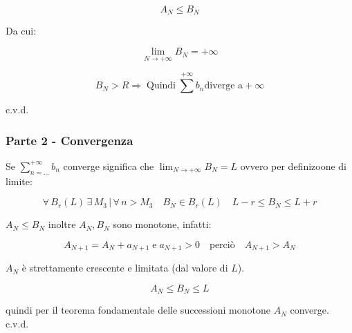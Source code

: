 \documentclass[../dimostrazioni]{subfiles}
\begin{document}
                \[  A_N \leqslant B_N   \]

                Da cui:

                \[  \lim_{N \to +\infty} B_N = +\infty  \]

                \[  B_N > R \Rightarrow \; \text{Quindi} \; \sum^{+\infty} b_n \text{diverge a} +\infty \]

                c.v.d.

            \subsubsection*{Parte 2 - Convergenza}

                Se \(\sum_{n=\dots}^{+\infty} b_n\) converge significa che \(   \lim_{N \to +\infty} B_N = L  \) ovvero per definizoone di limite:

                \[  \forall \, B_r(L)\, \exists \, M_3 \, | \, \forall \, n>M_3 \quad B_N \in B_r(L) \quad  L-r \leqslant B_N \leqslant L + r   \]
                
                \(A_N \leqslant B_N\) inoltre \(A_N, B_N\) sono monotone, infatti:

                \[  A_{N+1} = A_N + a_{N+1}\; \text{e} \; a_{N+1} > 0 \quad \text{perciò} \quad A_{N+1} > A_N\]

                \(A_N\) è strettamente crescente e limitata (dal valore di \(L\)).

                \[  A_N \leqslant B_N \leqslant L \]

                quindi per il teorema fondamentale delle successioni monotone \(A_N\) converge. c.v.d.
\end{document}
